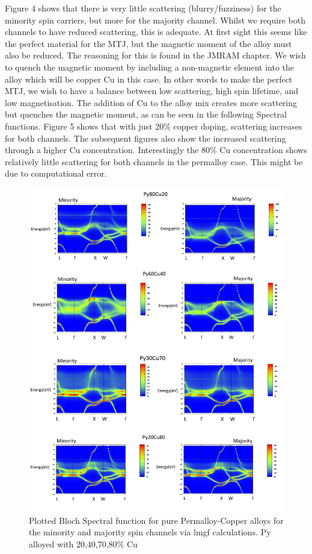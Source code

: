 \documentclass[12pt]{article}
\begin{document}
Figure 4 shows that there is very little scattering (blurry/fuzziness) for the minority spin carriers, but more for the majority channel. Whilst we require both channels to have reduced scattering, this is adequate. At first sight this seems like the perfect material for the MTJ, but the magnetic moment of the alloy must also be reduced. The reasoning for this is found in the JMRAM chapter. We wish to quench the magnetic moment by including a non-magnetic element into the alloy which will be copper Cu in this case. In other words to make the perfect MTJ, we wish to have a balance between low scattering, high spin lifetime, and low magnetisation. The addition of Cu to the alloy mix creates more scattering but quenches the magnetic moment, as can be seen in the following Spectral functions.
Figure 5 shows that with just 20\% copper doping, scattering increases for both channels. The subsequent figures also show the increased scattering through a higher Cu concentration. Interestingly the 80\% Cu concentration shows relatively little scattering for both channels in the permalloy case. This might be due to computational error.

\begin{figure}[h!]
    \centering
    \begin{measuredfigure}
    \includegraphics[scale=0.40]{complete/py}
    \caption{Plotted Bloch Spectral function for pure Permalloy-Copper alloys for the minority and majority spin channels via lmgf calculations. Py alloyed with 20,40,70,80\% Cu}
    \end{measuredfigure}
    \end{figure}
\end{document}
